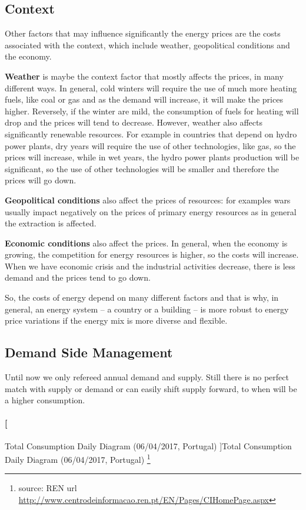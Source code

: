 \documentclass[]{book}
\let\oldparagraph\paragraph
\renewcommand{\paragraph}[1]{\oldparagraph{#1}\mbox{}}
\let\rmarkdownfootnote\footnote%
\def\footnote{\protect\rmarkdownfootnote}
\theoremstyle{definition}
\theoremstyle{definition}
\theoremstyle{definition}
\theoremstyle{remark}
\begin{document}
\subsection{Context}\label{context}

Other factors that may influence significantly the energy prices are the
costs associated with the context, which include weather, geopolitical
conditions and the economy.

\textbf{Weather} is maybe the context factor that mostly affects the
prices, in many different ways. In general, cold winters will require
the use of much more heating fuels, like coal or gas and as the demand
will increase, it will make the prices higher. Reversely, if the winter
are mild, the consumption of fuels for heating will drop and the prices
will tend to decrease. However, weather also affects significantly
renewable resources. For example in countries that depend on hydro power
plants, dry years will require the use of other technologies, like gas,
so the prices will increase, while in wet years, the hydro power plants
production will be significant, so the use of other technologies will be
smaller and therefore the prices will go down.

\textbf{Geopolitical conditions} also affect the prices of resources:
for examples wars usually impact negatively on the prices of primary
energy resources as in general the extraction is affected.

\textbf{Economic conditions} also affect the prices. In general, when
the economy is growing, the competition for energy resources is higher,
so the costs will increase. When we have economic crisis and the
industrial activities decrease, there is less demand and the prices tend
to go down.

So, the costs of energy depend on many different factors and that is
why, in general, an energy system -- a country or a building -- is more
robust to energy price variations if the energy mix is more diverse and
flexible.

\subsection{Demand Side Management}\label{demand-side-management}

Until now we only refereed annual demand and supply. Still there is no
perfect match with supply or demand or can easily shift supply forward,
to when will be a higher consumption.

\paragraph[Total Consumption Daily Diagram (06/04/2017, Portugal)
]{\texorpdfstring{Total Consumption Daily Diagram (06/04/2017, Portugal)
\footnote{source: REN url
  \url{http://www.centrodeinformacao.ren.pt/EN/Pages/CIHomePage.aspx}}}{Total Consumption Daily Diagram (06/04/2017, Portugal) }}\label{total-consumption-daily-diagram-06042017-portugal-8}
\end{document}
